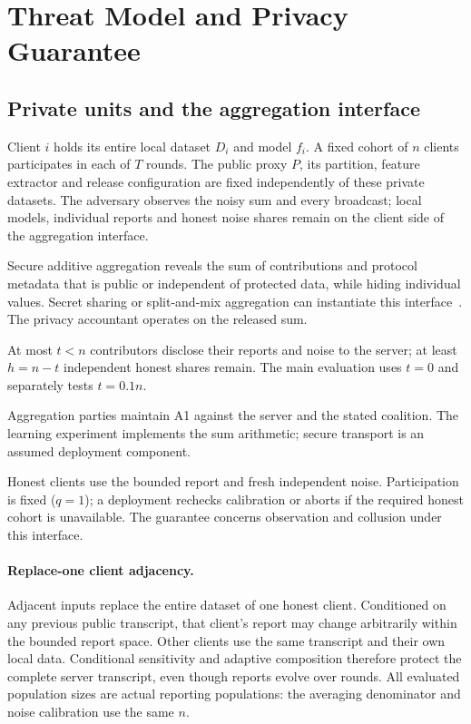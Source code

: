 \section{Threat Model and Privacy Guarantee}
\label{sec:threat}

\subsection{Private units and the aggregation interface}
\label{sec:threat:setting}

Client $i$ holds its entire local dataset $D_i$ and model $f_i$. A fixed cohort
of $n$ clients participates in each of $T$ rounds. The public proxy $P$, its
partition, feature extractor and release configuration are fixed independently
of these private datasets. The adversary observes the noisy sum and every
broadcast; local models, individual reports and honest noise shares remain
on the client side of the aggregation interface.

\begin{description}[leftmargin=0pt,itemsep=2pt,topsep=2pt]
\item[A1 (aggregate-only view).] Secure additive aggregation reveals the
sum of contributions and protocol metadata that is public or independent
of protected data, while hiding individual values.
Secret sharing or split-and-mix aggregation can instantiate this
interface~\cite{bonawitz2017practical,corriganGibbs2017prio,ishai2006cryptography}.
The privacy accountant operates on the released sum.
\item[A2 (bounded collusion).] At most $t<n$ contributors disclose their
reports and noise to the server; at least $h=n-t$ independent honest shares
remain. The main evaluation uses $t=0$ and separately tests $t=0.1n$.
\item[A3 (protected aggregation).] Aggregation parties maintain A1 against
the server and the stated coalition. The learning experiment implements the
sum arithmetic; secure transport is an assumed deployment component.
\item[A4 (compliant contributions).] Honest clients use the bounded report
and fresh independent noise. Participation is fixed ($q=1$); a deployment
rechecks calibration or aborts if the required honest cohort is unavailable.
The guarantee concerns observation and collusion under this interface.
\end{description}

\paragraph{Replace-one client adjacency.}
Adjacent inputs replace the entire dataset of one honest client. Conditioned
on any previous public transcript, that client's report may change arbitrarily
within the bounded report space. Other clients use the same transcript and
their own local data. Conditional sensitivity and adaptive composition
therefore protect the complete server transcript, even though reports evolve
over rounds. All evaluated population sizes are actual reporting populations:
the averaging denominator and noise calibration use the same $n$.

